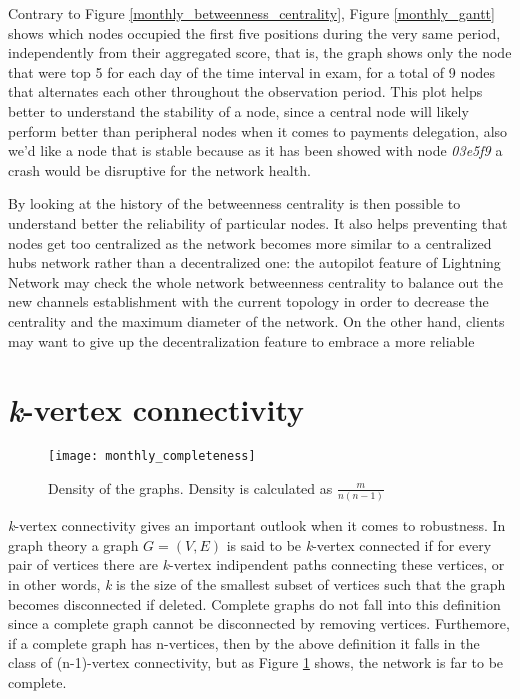 	Contrary to Figure \ref{monthly_betweenness_centrality}, Figure \ref{monthly_gantt} shows which nodes occupied the first five positions during the very same period, independently from their aggregated score, that is, the graph shows only the node that were top 5 for each day of the time interval in exam, for a total of 9 nodes that alternates each other throughout the observation period. This plot helps better to understand the stability of a node, since a central node will likely perform better than peripheral nodes when it comes to payments delegation, also we'd like a node that is stable because as it has been showed with node \textit{03e5f9} a crash would be disruptive for the network health.
	
	By looking at the history of the betweenness centrality is then possible to understand better the reliability of particular nodes. It also helps preventing that nodes get too centralized as the network becomes more similar to a centralized hubs network rather than a decentralized one: the autopilot feature of Lightning Network may check the whole network betweenness centrality to balance out the new channels establishment with the current topology in order to decrease the centrality and the maximum diameter of the network. On the other hand, clients may want to give up the decentralization feature to embrace a more reliable 
	
	\newpage
	
	\section{\textit{k}-vertex connectivity}

	\begin{figure}
		\texttt{[image: monthly\_completeness]}
		\caption{Density of the graphs. Density is calculated as $\frac{m}{n(n-1)}$}
		\label{monthly_completeness}
	\end{figure}
	
	\textit{k}-vertex connectivity gives an important outlook when it comes to robustness. In graph theory a graph $G = (V,E)$ is said to be \textit{k}-vertex connected if for every pair of vertices there are \textit{k}-vertex indipendent paths connecting these vertices, or in other words, \textit{k} is the size of the smallest subset of vertices such that the graph becomes disconnected if deleted. Complete graphs do not fall into this definition since a complete graph cannot be disconnected by removing vertices. Furthemore, if a complete graph has n-vertices, then by the above definition it falls in the class of (n-1)-vertex connectivity, but as Figure \ref{monthly_completeness} shows, the network is far to be complete.

